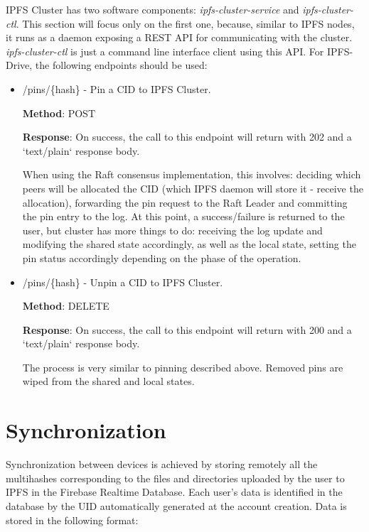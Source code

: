 \documentclass[12pt]{report}
\begin{document}
IPFS Cluster has two software components: \textit{ipfs-cluster-service} and \textit{ipfs-cluster-ctl}. This section will focus only on the first one, because, similar to IPFS nodes, it runs as a daemon exposing a REST API for communicating with the cluster. \textit{ipfs-cluster-ctl} is just a command line interface client using this API. For IPFS-Drive, the following endpoints should be used:

\begin{itemize}
\item {\ttfamily /pins/\{hash\}} - Pin a CID to IPFS Cluster.

\textbf{Method}: POST

\textbf{Response}: On success, the call to this endpoint will return with 202 and a `text/plain` response body.

When using the Raft consensus implementation, this involves: deciding which peers will be allocated the CID (which IPFS daemon will store it - receive the allocation), forwarding the pin request to the Raft Leader and committing the pin entry to the log. At this point, a success/failure is returned to the user, but cluster has more things to do:  receiving the log update and modifying the shared state accordingly, as well as the local state, setting the pin status accordingly depending on the phase of the operation. \cite{ipfscluster}

\item {\ttfamily /pins/\{hash\}} - Unpin a CID to IPFS Cluster.

\textbf{Method}: DELETE

\textbf{Response}: On success, the call to this endpoint will return with 200 and a `text/plain` response body.

The process is very similar to pinning described above. Removed pins are wiped from the shared and local states.

\end{itemize}

\section{Synchronization}
\label{sec:sync}

Synchronization between devices is achieved by storing remotely all the multihashes corresponding to the files and directories uploaded by the user to IPFS in the Firebase Realtime Database. Each user's data is identified in the database by the UID automatically generated at the account creation. Data is stored in the following format: 
\end{document}
